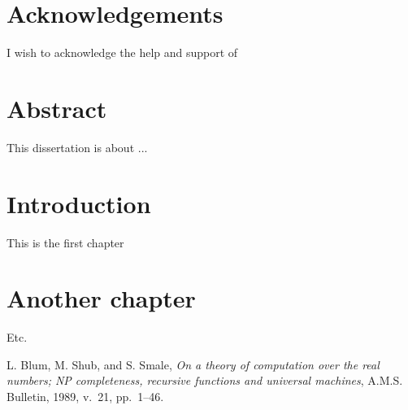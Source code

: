 \documentclass{ttuthes2007}
\begin{document}
\chapter{Acknowledgements}
I wish to acknowledge the help and support of 


\tableofcontents

\chapter{Abstract}
This dissertation is about ...


\listoftables

\listoffigures




\mainmatter


\chapter{Introduction}

This is the first chapter

\chapter{Another chapter}

Etc.


\backmatter


\begin{thebibliography}{99}

  L. Blum, M. Shub, and S. Smale, \emph{On a theory of
computation over the real numbers; NP completeness, recursive
functions and universal machines}, A.M.S. Bulletin, 1989, v.~21, pp.~1--46. 


\end{thebibliography}
\end{document}

